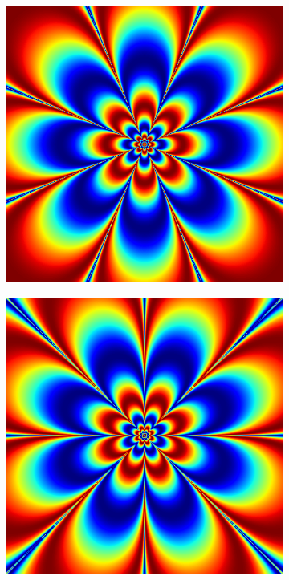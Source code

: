 \begin{figure}
\begin{subfigure}{.32\textwidth}
\includegraphics[width=\textwidth]{inv4_real.png}
\end{subfigure}
\begin{subfigure}{.32\textwidth}
\includegraphics[width=\textwidth]{inv4_imag.png}

\end{subfigure}
\end{figure}
